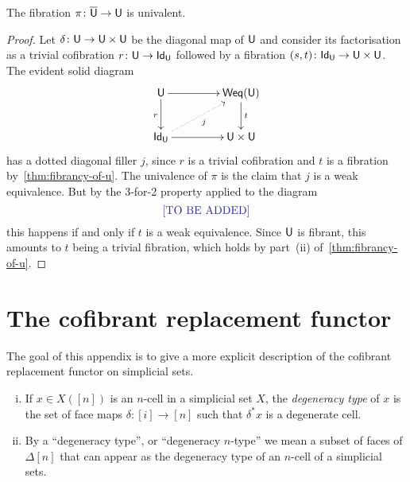 \documentclass[reqno,10pt,a4paper,oneside,draft]{amsart}
\begin{document}
\begin{corollary} The fibration $\pi \colon \overline{\mathsf{U}} \to \mathsf{U}$ is univalent.
\end{corollary}

\begin{proof} Let $\delta \colon \mathsf{U} \to \mathsf{U} \times \mathsf{U}$ be the diagonal map of $\mathsf{U}$ and consider its factorisation
as a trivial cofibration $r \colon \mathsf{U} \to \mathsf{Id}_{\mathsf{U}}$ followed by a fibration $(s,t) \colon \mathsf{Id}_{\mathsf{U}} \to \mathsf{U} \times \mathsf{U}$. The evident solid diagram
\[
\xymatrix@C=1.5cm{
\U \ar[r] \ar[d]_r & \Weq(\U) \ar[d]^{t} \\
\mathsf{Id}_\U \ar[r]  \ar@{.>}[ur]_{j} &  \U \times \U }
\]
has a dotted diagonal filler $j$, since $r$ is a trivial cofibration and $t$ is a fibration by~\cref{thm:fibrancy-of-u}. The univalence of $\pi$ is the claim that $j$ is a weak equivalence. But by the 3-for-2 property applied to the diagram
\[
\noten{\text{TO BE ADDED}}
\]
this happens if and only if $t$ is a weak equivalence. Since $\mathsf{U}$ is fibrant, this amounts to $t$ being a trivial
fibration, which holds by part~(ii) of~\cref{thm:fibrancy-of-u}. 
\end{proof} 


\bigskip



\appendix



\section{The cofibrant replacement functor}

The goal of this appendix is to give a more explicit description of the cofibrant replacement functor on simplicial sets.


\begin{definition}\hfill
\begin{enumerate}[(i)]  
\item If $x \in X([n])$ is an $n$-cell in a simplicial set $X$, the \emph{degeneracy type} of $x$ is the set of face maps $\delta:[i] \rightarrow [n]$ such that $\delta^* x$ is a degenerate cell.
\item By a ``degeneracy type'', or ``degeneracy $n$-type'' we mean a subset of faces of $\Delta[n]$ that can appear as the degeneracy type of an $n$-cell of a simplicial sets.
\end{enumerate}
\end{definition}

\medskip
\end{document}

